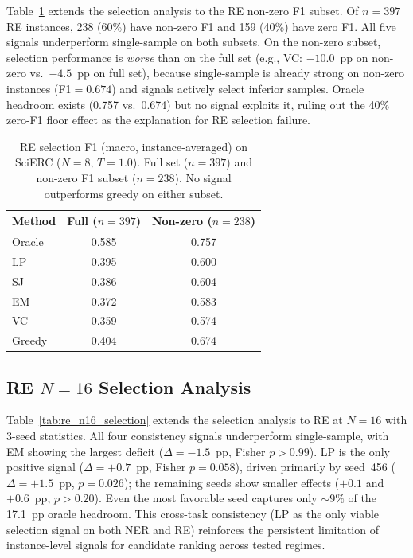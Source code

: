 Table~\ref{tab:re_cond_selection} extends the selection analysis to the RE non-zero F1 subset.
Of $n{=}397$ RE instances, 238 (60\%) have non-zero F1 and 159 (40\%) have zero F1.
All five signals underperform single-sample on both subsets.
On the non-zero subset, selection performance is \textit{worse} than on the full set (e.g., VC: $-10.0$~pp on non-zero vs.\ $-4.5$~pp on full set), because single-sample is already strong on non-zero instances (F1${=}0.674$) and signals actively select inferior samples.
Oracle headroom exists (0.757 vs.\ 0.674) but no signal exploits it, ruling out the 40\% zero-F1 floor effect as the explanation for RE selection failure.

\begin{table}[t]
\centering
\small
\caption{RE selection F1 (macro, instance-averaged) on SciERC ($N{=}8$, $T{=}1.0$). Full set ($n{=}397$) and non-zero F1 subset ($n{=}238$). No signal outperforms greedy on either subset.}
\label{tab:re_cond_selection}
\begin{tabular}{lcc}
\toprule
Method & Full ($n{=}397$) & Non-zero ($n{=}238$) \\
\midrule
Oracle & 0.585 & 0.757 \\
\midrule
LP & 0.395 & 0.600 \\
SJ & 0.386 & 0.604 \\
EM & 0.372 & 0.583 \\
VC & 0.359 & 0.574 \\
\midrule
Greedy & 0.404 & 0.674 \\
\bottomrule
\end{tabular}
\end{table}

\subsection{RE $N{=}16$ Selection Analysis}\label{app:re_n16_selection}

Table~\ref{tab:re_n16_selection} extends the selection analysis to RE at $N{=}16$ with 3-seed statistics.
All four consistency signals underperform single-sample, with EM showing the largest deficit ($\Delta{=}{-}1.5$~pp, Fisher $p{>}0.99$).
LP is the only positive signal ($\Delta{=}{+}0.7$~pp, Fisher $p{=}0.058$), driven primarily by seed~456 ($\Delta{=}{+}1.5$~pp, $p{=}0.026$); the remaining seeds show smaller effects ($+0.1$ and $+0.6$~pp, $p{>}0.20$).
Even the most favorable seed captures only ${\sim}9\%$ of the 17.1~pp oracle headroom.
This cross-task consistency (LP as the only viable selection signal on both NER and RE) reinforces the persistent limitation of instance-level signals for candidate ranking across tested regimes.

